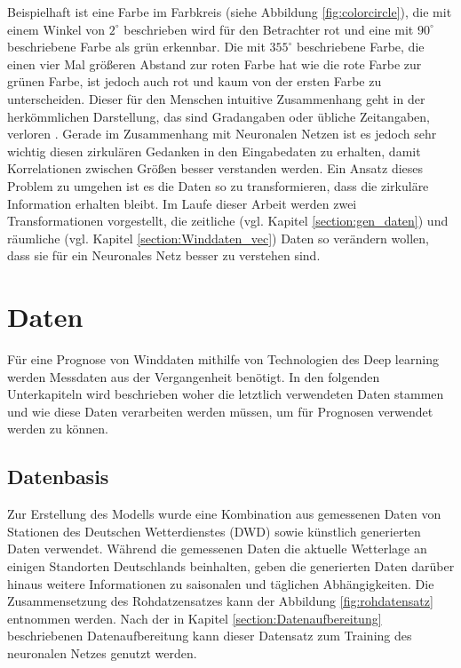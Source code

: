 \documentclass[
12pt, %
toc=listofnumbered, %
toc=chapterentrydotfill, %
numbers=noenddot, %
captions=tableheading, %
bibliography=numbered
]{scrreprt}
\let\Oldsection\section
\renewcommand{\section}{\FloatBarrier\Oldsection}
\begin{document}
Beispielhaft ist eine Farbe im Farbkreis (siehe Abbildung \ref{fig:colorcircle}), die mit einem Winkel von $2^\circ$ beschrieben wird für den Betrachter rot und eine mit $90^\circ$ beschriebene Farbe als grün erkennbar. Die mit $355^\circ$ beschriebene Farbe, die einen 
vier Mal größeren Abstand zur roten Farbe hat wie die rote Farbe zur grünen Farbe, ist jedoch auch rot und kaum von der ersten Farbe zu unterscheiden. 
Dieser für den Menschen intuitive Zusammenhang geht in der herkömmlichen Darstellung, das sind Gradangaben oder übliche Zeitangaben, verloren \cite{2016_London_EncodingCyclicalContinuous}. 
Gerade im Zusammenhang mit Neuronalen Netzen ist es jedoch sehr wichtig diesen zirkulären Gedanken in den Eingabedaten zu erhalten, damit Korrelationen zwischen Größen besser verstanden werden. 
Ein Ansatz dieses Problem zu umgehen ist es die Daten so zu transformieren, dass die zirkuläre Information erhalten bleibt. Im Laufe dieser Arbeit werden zwei Transformationen vorgestellt, die zeitliche (vgl. Kapitel \ref{section:gen_daten}) und räumliche (vgl. Kapitel \ref{section:Winddaten_vec}) Daten so verändern wollen, dass sie für ein Neuronales Netz besser zu verstehen sind.


\chapter{Daten}

Für eine Prognose von Winddaten mithilfe von Technologien des Deep learning werden Messdaten aus der Vergangenheit benötigt. 
In den folgenden Unterkapiteln wird beschrieben woher die letztlich verwendeten Daten stammen und wie diese Daten verarbeiten werden müssen, um für Prognosen verwendet werden zu können.

\section{Datenbasis}\label{section:datenbasis}
Zur Erstellung des Modells wurde eine Kombination aus gemessenen Daten von Stationen des Deutschen Wetterdienstes (DWD) sowie künstlich generierten Daten verwendet.
Während die gemessenen Daten die aktuelle Wetterlage an einigen Standorten Deutschlands beinhalten, geben die generierten Daten darüber hinaus weitere Informationen zu saisonalen und täglichen Abhängigkeiten. Die Zusammensetzung des Rohdatzensatzes kann der Abbildung \ref{fig:rohdatensatz} entnommen werden. Nach der in Kapitel \ref{section:Datenaufbereitung} beschriebenen Datenaufbereitung kann dieser Datensatz zum Training des neuronalen Netzes genutzt werden.
\end{document}
